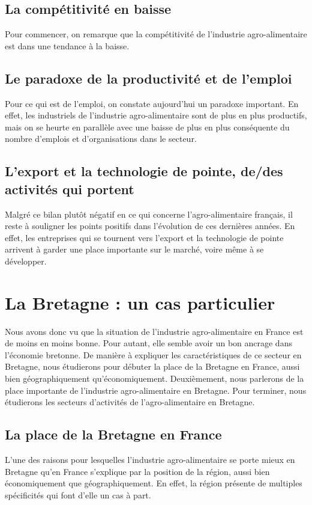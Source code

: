\documentclass[a4paper,10pt]{report}
\begin{document}
\subsection{La compétitivité en baisse}
Pour commencer, on remarque que la compétitivité de l’industrie agro-alimentaire est dans une tendance à la baisse.

\subsection{Le paradoxe de la productivité et de l'emploi}
Pour ce qui est de l’emploi, on constate aujourd’hui un paradoxe important. En effet, les industriels de l’industrie agro-alimentaire sont de plus en plus productifs, mais on se heurte en parallèle avec une baisse de plus en plus conséquente du nombre d’emplois et d’organisations dans le secteur.

\subsection{L'export et la technologie de pointe, de/des activités qui portent}
Malgré ce bilan plutôt négatif en ce qui concerne l’agro-alimentaire français, il reste à souligner les points positifs dans l’évolution de ces dernières années. En effet, les entreprises qui se tournent vers l’export et la technologie de pointe arrivent à garder une place importante sur le marché, voire même à se développer.

\section{La Bretagne : un cas particulier}
Nous avons donc vu que la situation de l’industrie agro-alimentaire en France est de moins en moins bonne. Pour autant, elle semble avoir un bon ancrage dans l’économie bretonne. De manière à expliquer les caractéristiques de ce secteur en Bretagne, nous étudierons pour débuter la place de la Bretagne en France, aussi bien géographiquement qu’économiquement. Deuxièmement, nous parlerons de la place importante de l’industrie agro-alimentaire en Bretagne. Pour terminer, nous étudierons les secteurs d’activités de l’agro-alimentaire en Bretagne.

\subsection{La place de la Bretagne en France}
L’une des raisons pour lesquelles l’industrie agro-alimentaire se porte mieux en Bretagne qu’en France s’explique par la position de la région, aussi bien économiquement que géographiquement. En effet, la région présente de multiples spécificités qui font d’elle un cas à part.
\end{document}
